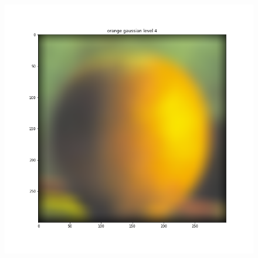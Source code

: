 \documentclass{article}
\begin{document}
\begin{figure}[!htb]
\endminipage
{}
    \includegraphics[width=\linewidth]{orange gaussian level 4.png}
\endminipage
\end{figure}
\end{document}
